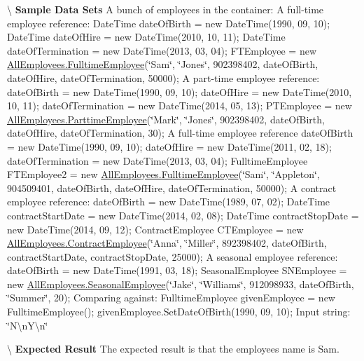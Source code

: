 \textbackslash{} {\bfseries  Sample Data Sets} A bunch of employees in the container\+: A full-\/time employee reference\+: Date\+Time date\+Of\+Birth = new Date\+Time(1990, 09, 10); Date\+Time date\+Of\+Hire = new Date\+Time(2010, 10, 11); Date\+Time date\+Of\+Termination = new Date\+Time(2013, 03, 04); F\+T\+Employee = new \hyperlink{class_all_employees_1_1_fulltime_employee}{All\+Employees.\+Fulltime\+Employee}(\char`\"{}\+Sam\char`\"{}, \char`\"{}\+Jones\char`\"{}, 902398402, date\+Of\+Birth, date\+Of\+Hire, date\+Of\+Termination, 50000); A part-\/time employee reference\+: date\+Of\+Birth = new Date\+Time(1990, 09, 10); date\+Of\+Hire = new Date\+Time(2010, 10, 11); date\+Of\+Termination = new Date\+Time(2014, 05, 13); P\+T\+Employee = new \hyperlink{class_all_employees_1_1_parttime_employee}{All\+Employees.\+Parttime\+Employee}(\char`\"{}\+Mark\char`\"{}, \char`\"{}\+Jones\char`\"{}, 902398402, date\+Of\+Birth, date\+Of\+Hire, date\+Of\+Termination, 30); A full-\/time employee reference date\+Of\+Birth = new Date\+Time(1990, 09, 10); date\+Of\+Hire = new Date\+Time(2011, 02, 18); date\+Of\+Termination = new Date\+Time(2013, 03, 04); Fulltime\+Employee F\+T\+Employee2 = new \hyperlink{class_all_employees_1_1_fulltime_employee}{All\+Employees.\+Fulltime\+Employee}(\char`\"{}\+Sam\char`\"{}, \char`\"{}\+Appleton\char`\"{}, 904509401, date\+Of\+Birth, date\+Of\+Hire, date\+Of\+Termination, 50000); A contract employee reference\+: date\+Of\+Birth = new Date\+Time(1989, 07, 02); Date\+Time contract\+Start\+Date = new Date\+Time(2014, 02, 08); Date\+Time contract\+Stop\+Date = new Date\+Time(2014, 09, 12); Contract\+Employee C\+T\+Employee = new \hyperlink{class_all_employees_1_1_contract_employee}{All\+Employees.\+Contract\+Employee}(\char`\"{}\+Anna\char`\"{}, \char`\"{}\+Miller\char`\"{}, 892398402, date\+Of\+Birth, contract\+Start\+Date, contract\+Stop\+Date, 25000); A seasonal employee reference\+: date\+Of\+Birth = new Date\+Time(1991, 03, 18); Seasonal\+Employee S\+N\+Employee = new \hyperlink{class_all_employees_1_1_seasonal_employee}{All\+Employees.\+Seasonal\+Employee}(\char`\"{}\+Jake\char`\"{}, \char`\"{}\+Williams\char`\"{}, 912098933, date\+Of\+Birth, \char`\"{}\+Summer\char`\"{}, 20); Comparing against\+: Fulltime\+Employee given\+Employee = new Fulltime\+Employee(); given\+Employee.\+Set\+Date\+Of\+Birth(1990, 09, 10); Input string\+: \char`\"{}\+N\textbackslash{}n\+Y\textbackslash{}n\char`\"{}

\textbackslash{} {\bfseries  Expected Result} The expected result is that the employee\textquotesingle{}s name is Sam.

